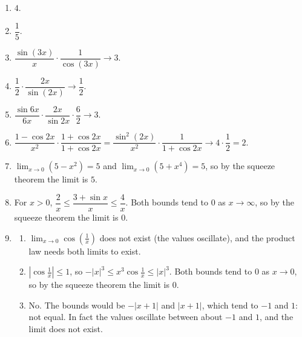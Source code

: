 \documentclass[11pt]{article}
\begin{document}
\newpage
\begin{solbox}
\begin{enumerate}[leftmargin=*,itemsep=4pt]
  \item $4$.
  \item $\dfrac15$.
  \item $\dfrac{\sin(3x)}{x}\cdot\dfrac{1}{\cos(3x)}\to3$.
  \item $\dfrac12\cdot\dfrac{2x}{\sin(2x)}\to\dfrac12$.
  \item $\dfrac{\sin 6x}{6x}\cdot\dfrac{2x}{\sin 2x}\cdot\dfrac{6}{2}\to3$.
  \item $\dfrac{1-\cos2x}{x^2}\cdot\dfrac{1+\cos2x}{1+\cos2x}=\dfrac{\sin^2(2x)}{x^2}\cdot\dfrac{1}{1+\cos2x}\to4\cdot\dfrac12=2$.
  \item $\displaystyle\lim_{x\to 0}(5-x^2)=5$ and $\displaystyle\lim_{x\to 0}(5+x^4)=5$, so by the squeeze theorem the limit is $5$.
  \item For $x>0$, $\dfrac2x\le\dfrac{3+\sin x}{x}\le\dfrac4x$. Both bounds tend to 0 as $x\to\infty$, so by the squeeze theorem the limit is $0$.
  \item \begin{enumerate}[label=(\alph*),leftmargin=*,itemsep=3pt]
    \item $\displaystyle\lim_{x\to 0}\cos\!\left(\tfrac1x\right)$ does not exist (the values oscillate), and the product law needs both limits to exist.
    \item $\left|\cos\tfrac1x\right|\le1$, so $-|x|^3\le x^3\cos\tfrac1x\le|x|^3$. Both bounds tend to 0 as $x\to0$, so by the squeeze theorem the limit is $0$.
    \item No. The bounds would be $-|x+1|$ and $|x+1|$, which tend to $-1$ and $1$: not equal. In fact the values oscillate between about $-1$ and $1$, and the limit does not exist.
  \end{enumerate}
\end{enumerate}
\end{solbox}
\end{document}
